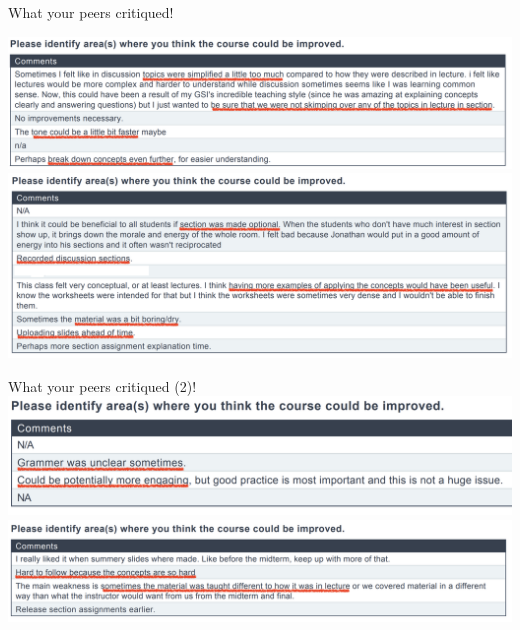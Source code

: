 \documentclass[11pt]{beamer}
\begin{document}
\begin{frame}{What your peers critiqued!}

\includegraphics[width=\textwidth]{figures/Feedback/critique1.png}
\includegraphics[width=\textwidth]{figures/Feedback/critique2.png}
\end{frame}


\begin{frame}{What your peers critiqued (2)!}
\includegraphics[width=\textwidth]{figures/Feedback/critique3.png}
\includegraphics[width=\textwidth]{figures/Feedback/critique4.png}
\end{frame}
\end{document}
